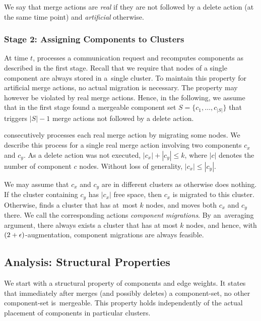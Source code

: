 We say that merge actions are \emph{real} if they are not followed
by a delete action (at the same time point) and \emph{artificial} otherwise. 



\subsubsection{Stage 2: Assigning Components to Clusters}

At time $t$, \CREP processes a communication request and recomputes components
as described in the first stage. Recall that we require that nodes of a single
component are always stored in a~single cluster. To maintain this property for
artificial merge actions, no actual migration is necessary. The property may
however be violated by real merge actions. Hence, in the following, we assume
that in the first stage \CREP found a mergeable component set $S = \{ c_1, 
\ldots, c_{|S|} \}$ that triggers $|S|-1$ merge actions not 
followed by a delete action.

\CREP consecutively processes each real merge action by migrating some nodes.
We describe this process for a single real merge action involving two
components $c_x$ and $c_y$. As a delete action was not executed, $|c_x| +
|c_y| \leq k$, where $|c|$ denotes the number of component $c$ nodes.
Without loss of generality, $|c_x| \leq |c_y|$.

We may assume that $c_x$ and $c_y$ are in different clusters as otherwise
\CREP does nothing. If the cluster containing $c_y$ has $|c_x|$ free space,
then $c_x$ is migrated to this cluster. Otherwise, \CREP finds a cluster that
has at~most $k$ nodes, and moves both $c_x$ and $c_y$ there. We call the
corresponding actions \emph{component migrations}. By an~averaging argument,
there always exists a cluster that has at most $k$ nodes, and hence, with
$(2+\epsilon)$-augmentation, component migrations are always feasible.



\subsection{Analysis: Structural Properties}

We start with a structural property of components and edge weights.
It states that immediately after \CREP merges (and
possibly deletes) a component-set, no other component-set is~mergeable. This
property holds independently of the actual placement of components in
particular clusters.

